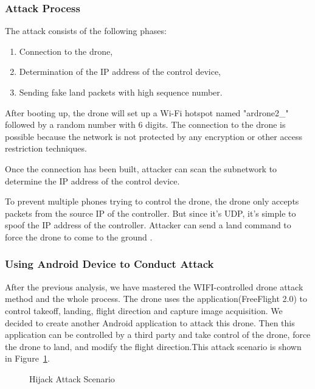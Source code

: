 \documentclass{acm_proc_article-sp}
\newcommand{\upcite}[1]{\textsuperscript{\textsuperscript{\cite{#1}}}}
\begin{document}
\subsubsection{Attack Process}

The attack consists of the following phases:

\begin{enumerate}
  \item Connection to the drone,
  \item Determination of the IP address of the control device,
  \item Sending fake land packets with high sequence number.
\end{enumerate}

After booting up, the drone will set up a Wi-Fi hotspot named "ardrone2\_" followed by a random number with 6 digits. The connection to the drone is possible because the network is not protected by any encryption or other access restriction techniques.

Once the connection has been built, attacker can scan the subnetwork to determine the IP address of the control device.

To prevent multiple phones trying to control the drone, the drone only accepts packets from the source IP of the controller. But since it's UDP, it's simple to spoof the IP address of the controller. Attacker can send a land command to force the drone to come to the ground\upcite{drone:python} .



\subsubsection{Using Android Device to Conduct Attack}

After the previous analysis, we have mastered the WIFI-controlled drone attack method and the whole process. The drone uses the application(FreeFlight 2.0) to control takeoff, landing, flight direction and capture image acquisition. We decided to create another Android application to attack this drone. Then this application can be controlled by a third party and take control of the drone, force the drone to land, and modify the flight direction.This attack scenario is shown in Figure~\ref{hijack}.

\begin{figure}
\centering
{}
\caption{Hijack Attack Scenario}
\label{hijack}
\end{figure}
\end{document}

